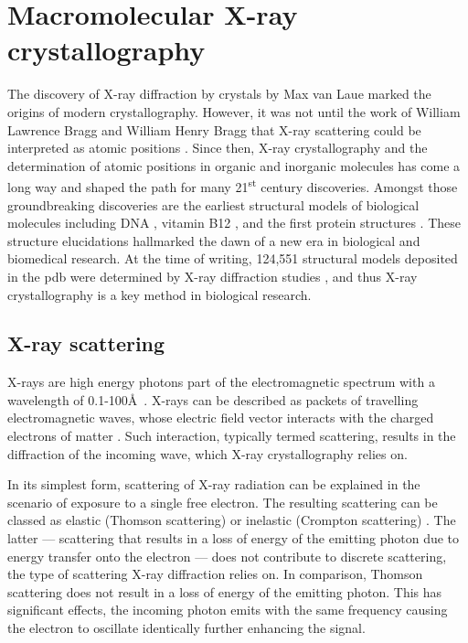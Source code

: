 
\section{Macromolecular X-ray crystallography} \label{sec:introduction_mx}
The discovery of X-ray diffraction by crystals by Max van Laue \cite{Friedrich1913-vx,Laue1913-sn} marked the origins of modern crystallography. However, it was not until the work of William Lawrence Bragg and William Henry Bragg that X-ray scattering could be interpreted as atomic positions \cite{Bragg1913-cx,Bragg1929-xp,Bragg1912-ht}. Since then, X-ray crystallography and the determination of atomic positions in organic and inorganic molecules has come a long way and shaped the path for many 21\textsuperscript{st} century discoveries. Amongst those groundbreaking discoveries are the earliest structural models of biological molecules including DNA \cite{Watson1953-qw}, vitamin B12 \cite{Hodgkin1956-mx}, and the first protein structures \cite{Blundell1971-mv,Blake1965-ng,Perutz1960-qz,Kendrew1958-on}. These structure elucidations hallmarked the dawn of a new era in biological and biomedical research. At the time of writing, 124,551 structural models deposited in the \gls{pdb} were determined by X-ray diffraction studies \cite{Berman2000-ua}, and thus X-ray crystallography is a key method in biological research.

\subsection{X-ray scattering}
X-rays are high energy photons part of the electromagnetic spectrum with a wavelength of 0.1-100\AA\ \cite{Rupp2010-nc}. X-rays can be described as packets of travelling electromagnetic waves, whose electric field vector interacts with the charged electrons of matter \cite{Rupp2010-nc}. Such interaction, typically termed scattering, results in the diffraction of the incoming wave, which X-ray crystallography relies on.

In its simplest form, scattering of X-ray radiation can be explained in the scenario of exposure to a single free electron. The resulting scattering can be classed as elastic (Thomson scattering) or inelastic (Crompton scattering) \cite{Rupp2010-nc}. The latter --- scattering that results in a loss of energy of the emitting photon due to energy transfer onto the electron --- does not contribute to discrete scattering, the type of scattering X-ray diffraction relies on. In comparison, Thomson scattering does not result in a loss of energy of the emitting photon. This has significant effects, the incoming photon emits with the same frequency causing the electron to oscillate identically further enhancing the signal.

